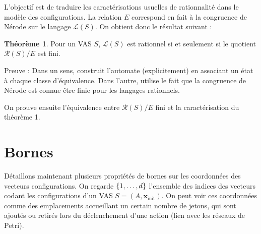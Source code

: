 \documentclass[a4paper,final]{article}
\theoremstyle{definition}
\newtheorem{Theorem}{Théorème}
\newcommand{\os}[1]{\left\{\mathinner{#1}\right\}}
\newcommand{\lang}{\ensuremath{\mathcal{L}}}
\newcommand{\vect}[1]{\ensuremath{\mathbf{#1}}}
\newcommand{\conf}[1]{\ensuremath{\mathcal{R}(#1)}}
\newcommand{\rel}{\ensuremath{E}}
\newcommand{\xinit}{\ensuremath{\vect{x}_\text{init}}}
\begin{document}
L'objectif est de traduire les caractérisations usuelles de rationnalité dans le modèle des configurations.
La relation $\rel$ correspond en fait à la congruence de Nérode sur le langage $\lang(S)$.
On obtient donc le résultat suivant :

\begin{Theorem}
    Pour un VAS $S$, $\lang(S)$ est rationnel si et seulement si le quotient $\conf{S}/\rel$ est fini.
\end{Theorem}

Preuve : 
Dans un sens, construit l'automate (explicitement) en associant un état à chaque classe d'équivalence.
Dans l'autre, utilise le fait que la congruence de Nérode est connue être finie pour les langages rationnels.


On prouve ensuite l'équivalence entre $\conf{S}/\rel$ fini et la caractérisation du théorème 1.


\section{Bornes}

Détaillons maintenant plusieurs propriétés de bornes sur les coordonnées des vecteurs configurations.
On regarde $\os{1,\dots,d}$ l'ensemble des indices des vecteurs codant les configurations d'un VAS $S=(A,\xinit)$.
On peut voir ces coordonnées comme des emplacements accueillant un certain nombre de jetons, qui sont ajoutés ou retirés lors du déclenchement d'une action (lien avec les réseaux de Petri).
\end{document}
